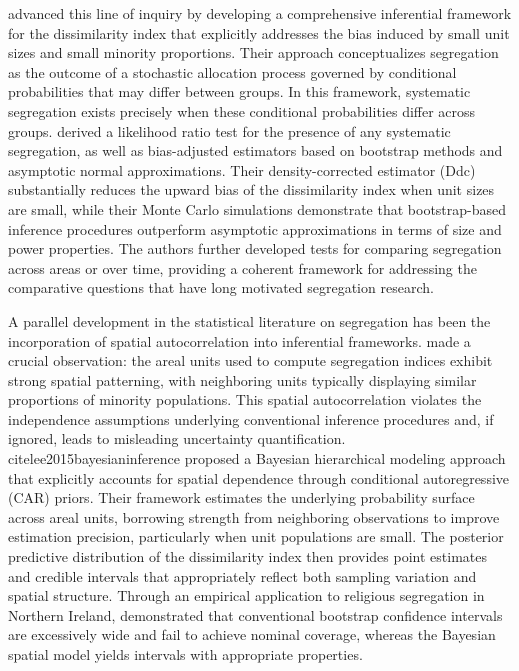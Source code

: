 \documentclass[12pt,a4paper]{article}
\begin{document}
\cite{allen2015more} advanced this line of inquiry by developing a comprehensive inferential framework for the dissimilarity index that explicitly addresses the bias induced by small unit sizes and small minority proportions. Their approach conceptualizes segregation as the outcome of a stochastic allocation process governed by conditional probabilities that may differ between groups. In this framework, systematic segregation exists precisely when these conditional probabilities differ across groups. \cite{allen2015more} derived a likelihood ratio test for the presence of any systematic segregation, as well as bias-adjusted estimators based on bootstrap methods and asymptotic normal approximations. Their density-corrected estimator (Ddc) substantially reduces the upward bias of the dissimilarity index when unit sizes are small, while their Monte Carlo simulations demonstrate that bootstrap-based inference procedures outperform asymptotic approximations in terms of size and power properties. The authors further developed tests for comparing segregation across areas or over time, providing a coherent framework for addressing the comparative questions that have long motivated segregation research.

A parallel development in the statistical literature on segregation has been the incorporation of spatial autocorrelation into inferential frameworks. \cite{lee2015bayesianinference} made a crucial observation: the areal units used to compute segregation indices exhibit strong spatial patterning, with neighboring units typically displaying similar proportions of minority populations. This spatial autocorrelation violates the independence assumptions underlying conventional inference procedures and, if ignored, leads to misleading uncertainty quantification. cite{lee2015bayesianinference} proposed a Bayesian hierarchical modeling approach that explicitly accounts for spatial dependence through conditional autoregressive (CAR) priors. Their framework estimates the underlying probability surface across areal units, borrowing strength from neighboring observations to improve estimation precision, particularly when unit populations are small. The posterior predictive distribution of the dissimilarity index then provides point estimates and credible intervals that appropriately reflect both sampling variation and spatial structure. Through an empirical application to religious segregation in Northern Ireland, \cite{lee2015bayesianinference} demonstrated that conventional bootstrap confidence intervals are excessively wide and fail to achieve nominal coverage, whereas the Bayesian spatial model yields intervals with appropriate properties.
\end{document}
